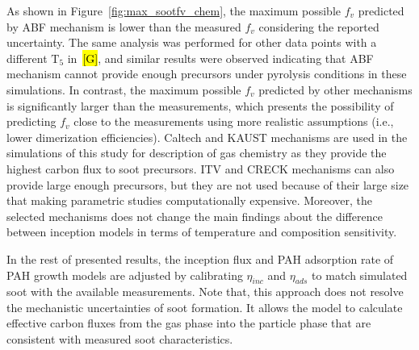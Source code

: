 As shown in Figure~\ref{fig:max_sootfv_chem}, the maximum possible $f_v$ predicted by ABF mechanism is lower than the measured $f_v$ considering the reported uncertainty. The same analysis was performed for other data points with a different $\mathrm{T_5}$ in~\hl{[G]}, and similar results were observed indicating that ABF mechanism cannot provide enough precursors under pyrolysis conditions in these simulations. In contrast, the maximum possible $f_v$ predicted by other mechanisms is significantly larger than the measurements, which presents the possibility of predicting $f_v$ close to the measurements using more realistic assumptions (i.e., lower dimerization efficiencies). Caltech and KAUST mechanisms are used in the simulations of this study for description of gas chemistry as they provide the highest carbon flux to soot precursors. ITV and CRECK mechanisms can also provide large enough precursors, but they are not used because of their large size that making parametric studies computationally expensive. Moreover, the selected mechanisms does not change the main findings about the difference between inception models in terms of temperature and composition sensitivity.

In the rest of presented results, the inception flux and PAH adsorption rate of PAH growth models are adjusted by calibrating $\eta_{inc}$ and $\eta_{ads}$ to match simulated soot with the available measurements. Note that, this approach does not resolve the mechanistic uncertainties of soot formation. It allows the model to calculate effective carbon fluxes from the gas phase into the particle phase that are consistent with measured soot characteristics.